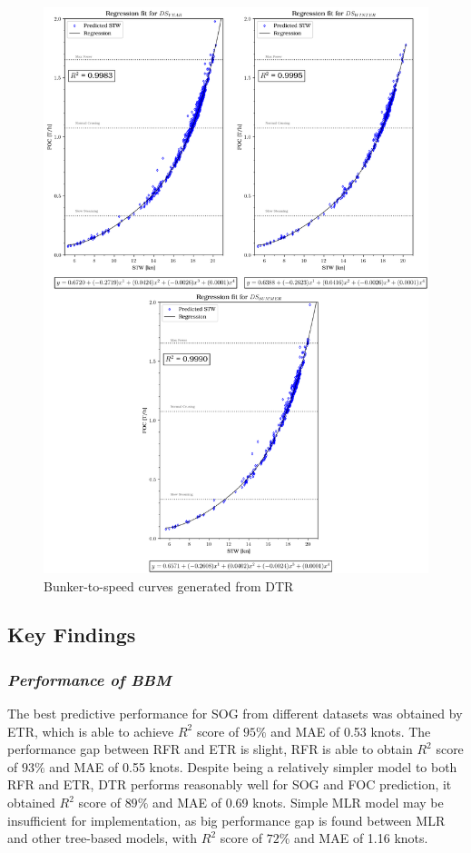 \begin{figure}[h!]
    \centering
    \includegraphics[width=.9\linewidth]{02_figures/poly_dtr_combi.png}
    \caption{Bunker-to-speed curves generated from DTR}
    \label{fig:FOC_plot_dtr_combi}
\end{figure}

\newpage


\subsection{Key Findings}\label{sec:key_findings}

\subsubsection*{\emph{Performance of BBM}}

The best predictive performance for SOG from different datasets was obtained by ETR, which is able to achieve $R^2$ score of $95\%$ and MAE of 0.53 knots. The performance gap between RFR and ETR is slight, RFR is able to obtain $R^2$ score of $93\%$ and MAE of 0.55 knots. Despite being a relatively simpler model to both RFR and ETR, DTR performs reasonably well for SOG and FOC prediction, it obtained $R^2$ score of $89\%$ and MAE of 0.69 knots. Simple MLR model may be insufficient for implementation, as big performance gap is found between MLR and other tree-based models, with $R^2$ score of $72\%$ and MAE of 1.16 knots.\\

